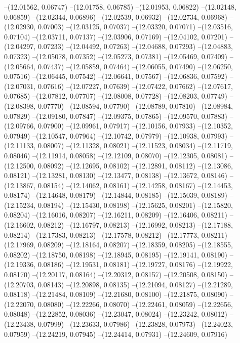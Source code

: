 --(12.01562, 0.06747)
--(12.01758, 0.06785)
--(12.01953, 0.06822)
--(12.02148, 0.06859)
--(12.02344, 0.06896)
--(12.02539, 0.06932)
--(12.02734, 0.06968)
--(12.02930, 0.07003)
--(12.03125, 0.07037)
--(12.03320, 0.07071)
--(12.03516, 0.07104)
--(12.03711, 0.07137)
--(12.03906, 0.07169)
--(12.04102, 0.07201)
--(12.04297, 0.07233)
--(12.04492, 0.07263)
--(12.04688, 0.07293)
--(12.04883, 0.07323)
--(12.05078, 0.07352)
--(12.05273, 0.07381)
--(12.05469, 0.07409)
--(12.05664, 0.07437)
--(12.05859, 0.07464)
--(12.06055, 0.07490)
--(12.06250, 0.07516)
--(12.06445, 0.07542)
--(12.06641, 0.07567)
--(12.06836, 0.07592)
--(12.07031, 0.07616)
--(12.07227, 0.07639)
--(12.07422, 0.07662)
--(12.07617, 0.07685)
--(12.07812, 0.07707)
--(12.08008, 0.07728)
--(12.08203, 0.07749)
--(12.08398, 0.07770)
--(12.08594, 0.07790)
--(12.08789, 0.07810)
--(12.08984, 0.07829)
--(12.09180, 0.07847)
--(12.09375, 0.07865)
--(12.09570, 0.07883)
--(12.09766, 0.07900)
--(12.09961, 0.07917)
--(12.10156, 0.07933)
--(12.10352, 0.07949)
--(12.10547, 0.07964)
--(12.10742, 0.07979)
--(12.10938, 0.07993)
--(12.11133, 0.08007)
--(12.11328, 0.08021)
--(12.11523, 0.08034)
--(12.11719, 0.08046)
--(12.11914, 0.08058)
--(12.12109, 0.08070)
--(12.12305, 0.08081)
--(12.12500, 0.08092)
--(12.12695, 0.08102)
--(12.12891, 0.08112)
--(12.13086, 0.08121)
--(12.13281, 0.08130)
--(12.13477, 0.08138)
--(12.13672, 0.08146)
--(12.13867, 0.08154)
--(12.14062, 0.08161)
--(12.14258, 0.08167)
--(12.14453, 0.08174)
--(12.14648, 0.08179)
--(12.14844, 0.08185)
--(12.15039, 0.08189)
--(12.15234, 0.08194)
--(12.15430, 0.08198)
--(12.15625, 0.08201)
--(12.15820, 0.08204)
--(12.16016, 0.08207)
--(12.16211, 0.08209)
--(12.16406, 0.08211)
--(12.16602, 0.08212)
--(12.16797, 0.08213)
--(12.16992, 0.08213)
--(12.17188, 0.08214)
--(12.17383, 0.08213)
--(12.17578, 0.08212)
--(12.17773, 0.08211)
--(12.17969, 0.08209)
--(12.18164, 0.08207)
--(12.18359, 0.08205)
--(12.18555, 0.08202)
--(12.18750, 0.08198)
--(12.18945, 0.08195)
--(12.19141, 0.08190)
--(12.19336, 0.08186)
--(12.19531, 0.08181)
--(12.19727, 0.08176)
--(12.19922, 0.08170)
--(12.20117, 0.08164)
--(12.20312, 0.08157)
--(12.20508, 0.08150)
--(12.20703, 0.08143)
--(12.20898, 0.08135)
--(12.21094, 0.08127)
--(12.21289, 0.08118)
--(12.21484, 0.08109)
--(12.21680, 0.08100)
--(12.21875, 0.08090)
--(12.22070, 0.08080)
--(12.22266, 0.08070)
--(12.22461, 0.08059)
--(12.22656, 0.08048)
--(12.22852, 0.08036)
--(12.23047, 0.08024)
--(12.23242, 0.08012)
--(12.23438, 0.07999)
--(12.23633, 0.07986)
--(12.23828, 0.07973)
--(12.24023, 0.07959)
--(12.24219, 0.07945)
--(12.24414, 0.07931)
--(12.24609, 0.07916)
